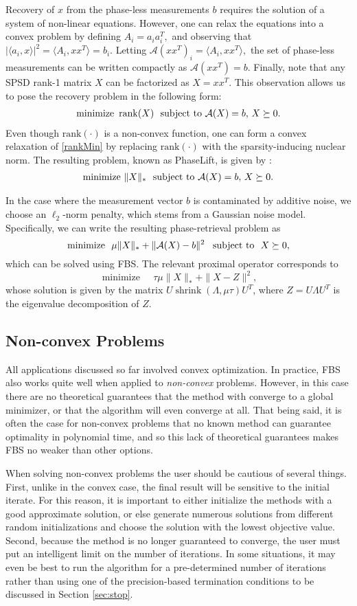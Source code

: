 \documentclass{amsart}
\newcommand{\eqn}[2]{\begin{equation}\label{#1}#2\end{equation}}
\newcommand{\aln}[1]{\begin{align}#1\end{align}}
\newcommand{\ra}{\rangle}
\newcommand{\la}{\langle}
\newcommand{\st}{\hbox{ \,\,subject to\,\, }}
\newcommand{\mcA}{\mathcal{A}}
\DeclareMathOperator*{\minimize}{minimize\quad}
\DeclareMathOperator*{\shrink}{shrink}
\theoremstyle{definition}
\begin{document}
Recovery of $x$ from the phase-less measurements $b$ requires the solution of a system of non-linear equations.  However, one can relax the equations into a convex problem by defining $A_i = a_ia_i^T,$ and observing that $|\la a_i,x \ra|^2  = \la A_i,xx^T \ra = b_i.$  Letting $\mcA(xx^T)_i =\la A_i,xx^T \ra,$ the set of phase-less measurements  can be  written compactly as $\mcA(xx^T)=b.$   Finally, note that any SPSD rank-1 matrix $X$ can be factorized as $X=xx^T.$  This observation allows us to pose the recovery problem in the following form:
         \aln{\label{rankMin}
          \minimize \!\!\!\!\mathrm{rank}(X) \st  \!\! \mcA(X) = b, \, X\succeq 0.
          }
Even though $\mathrm{rank}(\cdot)$ is a non-convex function, one can form a  convex relaxation of \eqref{rankMin} by replacing $\mathrm{rank}(\cdot)$ with the sparsity-inducing nuclear norm.  The resulting problem, known as PhaseLift, is given by \cite{CSV13}:
      \aln{\label{rankMinrelaxed}
        \minimize\!\!\!\!\! \|X\|_*  \st  \!\! \mcA(X) = b, \, X\succeq 0.
          }
         
In the case where the measurement vector $b$ is contaminated by additive noise, we choose an  $\ell_2$-norm penalty, which stems from a Gaussian noise model. Specifically, we can write the resulting phase-retrieval problem as
        \eqn{smoothRankMin}{ 
          \minimize \!\!\! \mu\|X\|_* +\|\mcA(X) - b\|^2 \, \st  X\succeq 0, \notag
          }
which can be solved using FBS.  The relevant proximal operator corresponds to
$$\minimize \tau\mu\|X\|_* +\|X-Z\|^2,$$
whose solution is given by the matrix $U \shrink(\Lambda,\mu\tau)U^T$, where  $Z=U\Lambda U^T$ is the eigenvalue decomposition of $Z$.

\subsection{Non-convex Problems}
All applications discussed so far involved convex optimization.  In practice, FBS also works quite well when applied to {\em non-convex} problems.  However, in this case there are no theoretical guarantees that the method with converge to a global minimizer, or that the algorithm will even converge at all.   That being said, it is often the case for non-convex problems that no known method can guarantee optimality in polynomial time, and so this lack of theoretical guarantees makes FBS no weaker than other options.  

  When solving non-convex problems the user should be cautious of several things.  First, unlike in the convex case, the final result will be sensitive to the initial iterate.  For this reason, it is important to either initialize the methods with a good approximate solution, or else generate numerous solutions from different random initializations and choose the solution with the lowest objective value.    Second, because the method is no longer guaranteed to converge, the user must put an intelligent limit on the number of iterations.  In some situations, it may even be best to run the algorithm for a pre-determined number of iterations rather than using one of the precision-based termination conditions to be discussed in Section \ref{sec:stop}.
\end{document}
